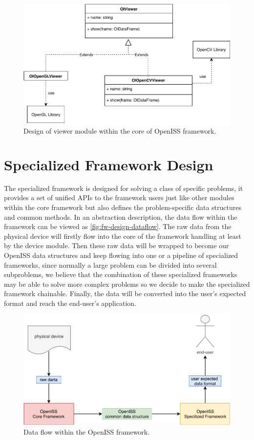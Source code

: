 \begin{figure}
    \centering
    \includegraphics[scale=0.8]{figures/framework_core_viewer.pdf}
    \caption{Design of viewer module within the core of OpenISS framework.}
    \label{fig:fw-core-viewer}
\end{figure}

\section{Specialized Framework Design}
\label{sec:fw-design-spec}

The specialized framework is designed for solving a class of specific problems,
it provides a set of unified APIs to the framework users just like other
modules within the core framework but also defines the problem-specific data
structures and common methods. In an abstraction description, the data flow
within the framework can be viewed as \autoref{fig:fw-design-dataflow}. The raw
data from the physical device will firstly flow into the core of the framework
handling at least by the device module. Then these raw data will be wrapped to
become our OpenISS data structures and keep flowing into one or a pipeline of
specialized frameworks, since normally a large problem can be divided into
several subproblems, we believe that the combination of these specialized
frameworks may be able to solve more complex problems so we decide to make the
specialized framework chainable. Finally, the data will be converted into the
user's expected format and reach the end-user's application.

\begin{figure}
    \centering
    \includegraphics[scale=0.8]{figures/framework_dataflow.pdf}
    \caption{Data flow within the OpenISS framework.}
    \label{fig:fw-design-dataflow}
\end{figure}

